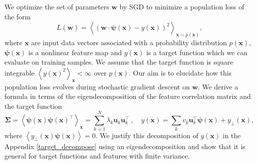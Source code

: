 \documentclass{article} %
\def\x{\bm x}
\def\w{\bm w}
\def\x{\mathbf x}
\def\w{\mathbf w}
\def\bSigma{\mathbf \Sigma}
\def\u{\mathbf u}
\def\G{\mathbf G}
\def\h{\mathbf h}
\begin{document}
We optimize the set of parameters $\w$ by SGD to minimize a population loss of the form 
\begin{equation}
    L(\w) = \left< \left( \w \cdot \bm\psi(\x) - y(\x) \right)^2 \right>_{\x \sim p(\x)},
\end{equation}
where $\x$ are input data vectors associated with a probability distribution $p(\x)$, $\bm\psi(\x)$ is a nonlinear feature map and $y(\x)$ is a target function which we can evaluate on training samples. We assume that the target function is square integrable $\left< y(\x)^2 \right>_{\x} < \infty$ over $p(\x)$. Our aim is to elucidate how this population loss evolves during stochastic gradient descent on $\w$.  We derive a formula in terms of the eigendecomposition of the feature correlation matrix and the target function
\begin{equation}
    \bSigma = \left< \bm\psi(\x) \bm\psi(\x)^\top \right>_{\x} =  \sum_{k=1}^N \lambda_k \u_k \u_k^\top \ , \quad y(\x) = \sum_{k} v_k \u_k^\top \bm\psi(\x) + y_{\bot}(\x),
\end{equation}
%
where $\left< y_\perp(\x) \bm\psi(\x) \right> = 0$. We justify this decomposition of $y(\x)$ in the Appendix \ref{target_decompose} using an eigendecomposition and show that it is general for target functions and features with finite variance. 



\end{document}
